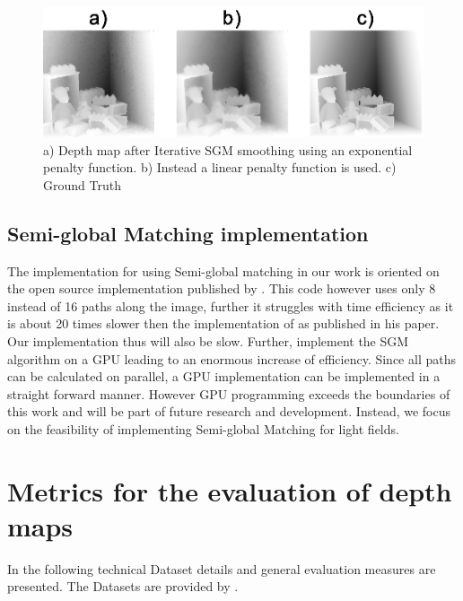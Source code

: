 \documentclass  [
  paper    = a4,
  BCOR     = 10mm,
  twoside,
  fontsize = 12pt,
  fleqn,
  toc      = bibnumbered,
  toc      = listofnumbered,
  numbers  = noendperiod,
  headings = normal,
  listof   = leveldown,
  version  = 3.03
]                                       {scrreprt}
\begin{document}
\begin{figure}
	\centering
	\includegraphics[width=1\linewidth]{images/linear_iteration}
	\caption[Linear Cost function results]{a) Depth map after Iterative SGM smoothing using an exponential penalty function. b) Instead a linear penalty function is used. c) Ground Truth}
	\label{fig:lineariteration}
\end{figure}
\subsection{Semi-global Matching implementation}
\label{sec:SGM_implement}
The implementation for using Semi-global matching in our work is oriented on the open source implementation published by \cite{sgmimplement}. This code however uses only 8 instead of 16 paths along the image, further it struggles with time efficiency as it is about 20 times slower then the implementation of \cite{hirschmuller2005accurate} as published in his paper. Our implementation thus will also be slow. Further, \cite{ernst2008mutual} implement the SGM algorithm on a GPU leading to an enormous increase of efficiency. Since all paths can be calculated on parallel, a GPU implementation can be implemented in a straight forward manner. However GPU programming exceeds the boundaries of this work and will be part of future research and development. Instead, we focus on the feasibility of implementing Semi-global Matching for light fields.
\section{Metrics for the evaluation of depth maps}
In the following technical Dataset details and general evaluation measures are presented. The Datasets are provided by \cite{honauer2016benchmark}.
\end{document}
